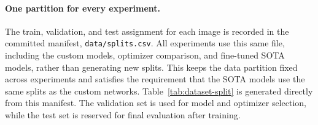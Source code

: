 \paragraph{One partition for every experiment.}
The train, validation, and test assignment for each image is recorded in the
committed manifest, \texttt{data/splits.csv}. All experiments use this same
file, including the custom models, optimizer comparison, and fine-tuned SOTA
models, rather than generating new splits. This keeps the data partition fixed
across experiments and satisfies the requirement that the SOTA models use the
same splits as the custom networks. Table~\ref{tab:dataset-split} is generated
directly from this manifest. The validation set is used for model and
optimizer selection, while the test set is reserved for final evaluation after
training.

\begin{table}[htbp]
  \centering
  \caption{Images per class in each set, generated from the committed split
  manifest \texttt{data/splits.csv}.}
  \label{tab:dataset-split}
\end{table}
